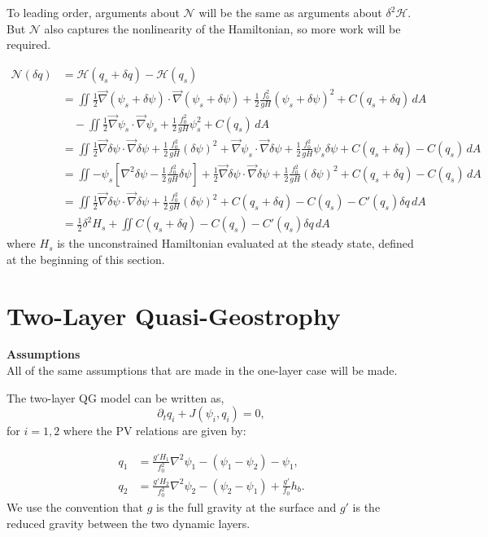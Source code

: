\documentclass[12pt]{article}
\begin{document}
    To leading order, arguments about $\mathcal{N}$ will be the same as arguments about $\delta^2 \mathcal{H}$. But $\mathcal{N}$ also captures the nonlinearity of the Hamiltonian, so more work will be required.
  
    \begin{align*}
      \mathcal{N}(\delta q) 
      & = \mathcal{H}(q_s + \delta q) - \mathcal{H}(q_s) \\
      &= \iint  \frac12 \vec\nabla(\psi_s + \delta \psi) \cdot \vec\nabla(\psi_s + \delta \psi) + \frac12 \frac{f_0^2}{g H} (\psi_s + \delta \psi)^2 + C(q_s + \delta q) \, dA \\
       & \quad - \iint  \frac12 \vec\nabla\psi_s \cdot \vec\nabla\psi_s + \frac12 \frac{f_0^2}{g H} \psi_s^2 + C(q_s) \, dA \\
      &= \iint \frac12 \vec\nabla\delta\psi \cdot \vec\nabla\delta\psi + \frac12 \frac{f_0^2}{g H} (\delta \psi)^2 + \vec\nabla\psi_s \cdot \vec\nabla\delta\psi + \frac12 \frac{f_0^2}{g H} \psi_s\delta\psi + C(q_s + \delta q) - C(q_s) \, dA \\
      &= \iint -\psi_s \left[ \nabla^2\delta\psi - \frac12 \frac{f_0^2}{g H} \delta\psi \right] + \frac12 \vec\nabla\delta\psi \cdot \vec\nabla\delta\psi + \frac12 \frac{f_0^2}{g H}(\delta\psi)^2 + C(q_s + \delta q) - C(q_s) \, dA \\
      &= \iint \frac12 \vec\nabla\delta\psi \cdot \vec\nabla\delta\psi + \frac12 \frac{f_0^2}{g H}(\delta \psi)^2 + C(q_s + \delta q) - C(q_s) -C'(q_s)\delta q\, dA \\
      &= \frac12 \delta^2 H_s + \iint C(q_s + \delta q) - C(q_s) -C'(q_s)\delta q\, dA
    \end{align*}
    where $H_s$ is the unconstrained Hamiltonian evaluated at the steady state, defined at the beginning of this section.


\section{Two-Layer Quasi-Geostrophy}
  \textbf{Assumptions} \\
  All of the same assumptions that are made in the one-layer case will be made.

  The two-layer QG model can be written as,
  $$
  \partial_t q_i + J(\psi_i, q_i) = 0,
  $$
  for $i=1,2$ where the PV relations are given by:

  \begin{align*}
    q_1 &= \frac{g'H_1}{f_0^2}\nabla^2 \psi_1 - (\psi_1 - \psi_2) - \psi_1,\\
    q_2 &= \frac{g'H_2}{f_0^2}\nabla^2 \psi_2 - (\psi_2 - \psi_1) + \frac{g'}{f_0} h_b.
  \end{align*}
  We use the convention that $g$ is the full gravity at the surface and $g'$ is the reduced gravity between the two dynamic layers.  
\end{document}
